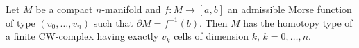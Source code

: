 Let $M$ be a compact $n$-manifold and $f: M \rightarrow [a, b]$ an admissible Morse function of type $(v_0, \ldots, v_n)$ such that $\partial M = f^{-1}(b)$. Then $M$ has the homotopy type of a finite CW-complex having exactly $v_k$ cells of dimension $k$, $k = 0, \ldots, n$.
